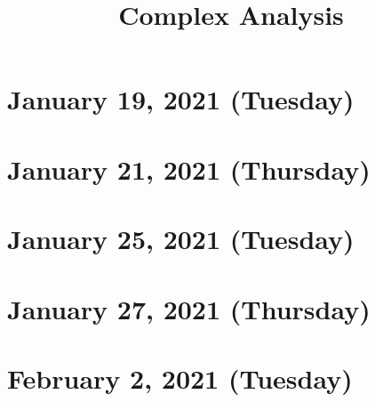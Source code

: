 \documentclass{pranav}
\title{Complex Analysis}
\begin{document}
\maketitle 
\tableofcontents

\newpage


\section{January 19, 2021 (Tuesday)}


\section{January 21, 2021 (Thursday)}


\section{January 25, 2021 (Tuesday)}


\section{January 27, 2021 (Thursday)}


\section{February 2, 2021 (Tuesday)}
\end{document}
